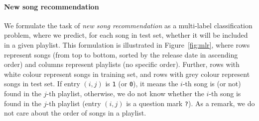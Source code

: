 


\paragraph{New song recommendation}

We formulate the task of \emph{new song recommendation} as a multi-label classification problem, 
where we predict, for each song in test set,
whether it will be included in a given playlist.
This formulation is illustrated in Figure~\ref{fig:mlr},
where rows represent songs (from top to bottom, sorted by the release date in ascending order)
and columns represent playlists (no specific order).
Further, rows with white colour represent songs in training set, and rows with grey colour represent songs in test set.
If entry $(i, j)$ is \texttt{1} (or \texttt{0}), it means the $i$-th song is (or not) found in the $j$-th playlist,
otherwise, we do not know whether the $i$-th song is found in the $j$-th playlist (\ie entry $(i, j)$ is a question mark \texttt{?}).
As a remark, we do not care about the order of songs in a playlist.


